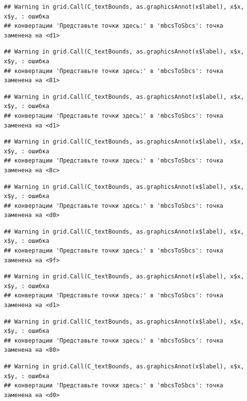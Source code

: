 \documentclass[]{book}
\begin{document}
\begin{verbatim}
## Warning in grid.Call(C_textBounds, as.graphicsAnnot(x$label), x$x, x$y, : ошибка
## конвертации 'Представьте точки здесь:' в 'mbcsToSbcs': точка заменена на <d1>
\end{verbatim}

\begin{verbatim}
## Warning in grid.Call(C_textBounds, as.graphicsAnnot(x$label), x$x, x$y, : ошибка
## конвертации 'Представьте точки здесь:' в 'mbcsToSbcs': точка заменена на <81>
\end{verbatim}

\begin{verbatim}
## Warning in grid.Call(C_textBounds, as.graphicsAnnot(x$label), x$x, x$y, : ошибка
## конвертации 'Представьте точки здесь:' в 'mbcsToSbcs': точка заменена на <d1>
\end{verbatim}

\begin{verbatim}
## Warning in grid.Call(C_textBounds, as.graphicsAnnot(x$label), x$x, x$y, : ошибка
## конвертации 'Представьте точки здесь:' в 'mbcsToSbcs': точка заменена на <8c>
\end{verbatim}

\begin{verbatim}
## Warning in grid.Call(C_textBounds, as.graphicsAnnot(x$label), x$x, x$y, : ошибка
## конвертации 'Представьте точки здесь:' в 'mbcsToSbcs': точка заменена на <d0>
\end{verbatim}

\begin{verbatim}
## Warning in grid.Call(C_textBounds, as.graphicsAnnot(x$label), x$x, x$y, : ошибка
## конвертации 'Представьте точки здесь:' в 'mbcsToSbcs': точка заменена на <9f>
\end{verbatim}

\begin{verbatim}
## Warning in grid.Call(C_textBounds, as.graphicsAnnot(x$label), x$x, x$y, : ошибка
## конвертации 'Представьте точки здесь:' в 'mbcsToSbcs': точка заменена на <d1>
\end{verbatim}

\begin{verbatim}
## Warning in grid.Call(C_textBounds, as.graphicsAnnot(x$label), x$x, x$y, : ошибка
## конвертации 'Представьте точки здесь:' в 'mbcsToSbcs': точка заменена на <80>
\end{verbatim}

\begin{verbatim}
## Warning in grid.Call(C_textBounds, as.graphicsAnnot(x$label), x$x, x$y, : ошибка
## конвертации 'Представьте точки здесь:' в 'mbcsToSbcs': точка заменена на <d0>
\end{verbatim}
\end{document}
